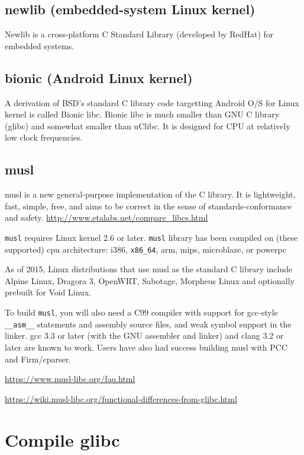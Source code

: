\subsection{newlib (embedded-system Linux kernel)}
\label{sec:newlib}

Newlib is a cross-platform C Standard Library (developed by RedHat) for
embedded systems.

\subsection{bionic (Android Linux kernel)}
\label{sec:bionic}

A derivation of BSD's standard C library code targetting Android O/S
for Linux kernel is called Bionic libc. Bionic libc is much smaller than
GNU C library (glibc) and somewhat smaller than uClibc. It is designed
for CPU at relatively low clock frequencies.

\subsection{musl}
\label{sec:musl}

musl is a new general-purpose implementation of the C library. It is
lightweight, fast, simple, free, and aims to be correct in the sense of
standards-conformance and safety.
\url{http://www.etalabs.net/compare_libcs.html}

\verb!musl! requires Linux kernel 2.6 or later.
\verb!musl! library has been compiled on (these supported) cpu architecture:
i386, \verb!x86_64!, arm, mips, microblaze, or powerpc

As of 2015, Linux distributions that use musl as the standard C library include
Alpine Linux, Dragora 3, OpenWRT, Sabotage, Morpheus Linux and
optionally prebuilt for Void Linux.


To build \verb!musl!, you will also need a C99 compiler with support for
gcc-style \verb!__asm__! statements and assembly source files, and weak symbol
support in the linker. gcc 3.3 or later (with the GNU assembler and linker) and
clang 3.2 or later are known to work. Users have also had success building musl
with PCC and Firm/cparser.

\url{https://www.musl-libc.org/faq.html}

\url{https://wiki.musl-libc.org/functional-differences-from-glibc.html}

\section{Compile glibc}


